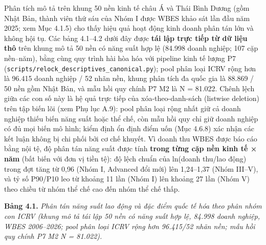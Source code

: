 \documentclass[
  a4paper,
  13pt]{extreport}
\begin{document}
Phân tích mô tả trên khung 50 nền kinh tế châu Á và Thái Bình Dương (gồm
Nhật Bản, thành viên thứ sáu của Nhóm I được WBES khảo sát lần đầu năm
2025; xem Mục 4.1.5) cho thấy hiệu quả hoạt động kinh doanh phân tán lớn
và không hội tụ. Các bảng 4.1--4.2 dưới đây được \textbf{tái lập trực
tiếp từ dữ liệu thô} trên khung mô tả 50 nền có năng suất hợp lệ (84.998
doanh nghiệp; 107 cặp nền--năm), bằng cùng quy trình hài hòa hóa với
pipeline kinh tế lượng P7
(\texttt{scripts/relock\_descriptives\_canonical.py}); pool phân loại
ICRV rộng hơn là 96.415 doanh nghiệp / 52 nhãn nền, khung phân tích đa
quốc gia là 88.869 / 50 nền gồm Nhật Bản, và mẫu hồi quy chính P7 M2 là
N = 81.022. Chênh lệch giữa các con số này là hệ quả trực tiếp của
xóa-theo-danh-sách (listwise deletion) trên tập biến lõi (xem Phụ lục
A.9): pool phân loại rộng nhất giữ cả doanh nghiệp thiếu biến năng suất
hoặc thể chế, còn mẫu hồi quy chỉ giữ doanh nghiệp có đủ mọi biến mô
hình; kiểm định ổn định điểm uốn (Mục 4.6.8) xác nhận các kết luận không
bị chi phối bởi cơ chế khuyết. Vì doanh thu WBES được báo cáo bằng nội
tệ, độ phân tán năng suất được tính \textbf{trong từng cặp nền kinh tế ×
năm} (bất biến với đơn vị tiền tệ): độ lệch chuẩn của ln(doanh thu/lao
động) trong đợt tăng từ 0,96 (Nhóm I, Advanced đổi mới) lên 1,24--1,37
(Nhóm III--V), và tỷ số P90/P10 leo từ khoảng 11 lần (Nhóm I) lên khoảng
27 lần (Nhóm V) theo chiều từ nhóm thể chế cao đến nhóm thể chế thấp.

\textbf{Bảng 4.1.} \emph{Phân tán năng suất lao động và đặc điểm quốc tế
hóa theo phân nhóm con ICRV (khung mô tả tái lập 50 nền có năng suất hợp
lệ, 84.998 doanh nghiệp, WBES 2006--2026; pool phân loại ICRV rộng hơn
96.415/52 nhãn nền; mẫu hồi quy chính P7 M2 N = 81.022).}
\end{document}
